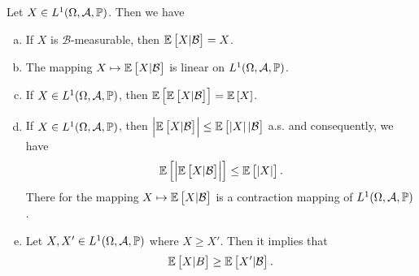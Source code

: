 \begin{proposition}
	Let $ X \in L^1(\Omega,\mathcal{A},\mathbb{P}) $. Then we have
	\begin{enumerate}[(a)]
		\item If $ X $ is $ \mathcal{B} $-measurable, then $ \mathbb{E}\left[X|\mathcal{B}\right] = X $.
		\item The mapping $ X\mapsto \mathbb{E}\left[X|\mathcal{B}\right] $ is linear on $ L^1(\Omega,\mathcal{A},\mathbb{P}) $.
		\item If $ X\in L^1(\Omega,\mathcal{A},\mathbb{P}) $, then $ \mathbb{E}\left[\mathbb{E}\left[X|\mathcal{B}\right]\right] = \mathbb{E}\left[X\right] $.
		\item If $ X\in L^1(\Omega,\mathcal{A},\mathbb{P}) $, then $ \left|\mathbb{E}\left[X|\mathcal{B}\right]\right| \leq \mathbb{E}\left[\left|X\right||\mathcal{B}\right] $ a.s. and consequently, we have
		\[ \mathbb{E}\left[\left|\mathbb{E}\left[X|\mathcal{B}\right]\right|\right] \leq \mathbb{E}\left[\left|X\right|\right]. \]
		There for the mapping $ X \mapsto \mathbb{E}\left[X|\mathcal{B}\right] $ is a contraction mapping of $ L^1(\Omega, \mathcal{A},\mathbb{P}) $.
		\item Let $ X,X'\in L^1(\Omega,\mathcal{A},\mathbb{P}) $ where $ X\geq X' $. Then it implies that 
		\[ \mathbb{E}\left[X|B\right] \geq \mathbb{E}\left[X'|\mathcal{B}\right]. \]
	\end{enumerate}
\end{proposition}
